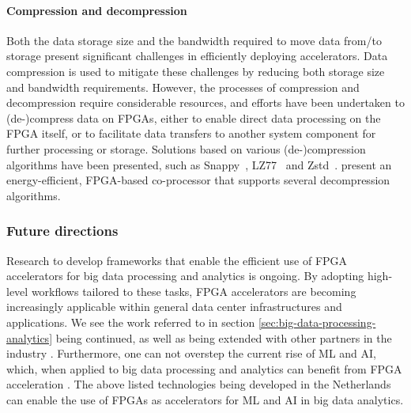 \paragraph{Compression and decompression} %

Both the data storage size and the bandwidth required to move data from/to storage %
present significant challenges in efficiently deploying accelerators. Data compression is used to mitigate these challenges by reducing both storage size and bandwidth requirements. However, the processes of 
compression and decompression require considerable resources, and efforts have been undertaken to (de-)compress data on FPGAs, either to enable direct data processing on the FPGA itself, or to facilitate data transfers to another system component for further processing or storage. Solutions %
based on various (de-)compression algorithms have been presented, such as Snappy~\cite{Fang2019AModel}, LZ77~\cite{Fang2020AnLogic} and Zstd~\cite{Chen2021FPGAAlgorithm}. %
\citet{Hoozemans2021EnergyASIP} present an energy-efficient, FPGA-based co-processor that supports several %
decompression algorithms. %

\subsubsection*{\bf{Future directions}}

Research to develop frameworks that enable the efficient use of FPGA accelerators for big data processing and analytics is ongoing. By adopting high-level workflows tailored to these tasks, FPGA accelerators are becoming increasingly applicable within general data center infrastructures and applications. 
We see the work referred to in section \ref{sec:big-data-processing-analytics} being continued, %
as well as being extended with other partners in the industry %
\cite{10.1145/3624062.3624541, 10305451, Reukers2023AnIR, groet2024leveraging}.
Furthermore, one can not overstep the current rise of ML and AI, which, when applied to big data processing and analytics \cite{Rellermeyer2019TheProcessing} can benefit from FPGA acceleration \cite{10.1145/3613963}. The above listed technologies being developed in the Netherlands can enable the use of FPGAs as accelerators for ML and AI in big data analytics. 


